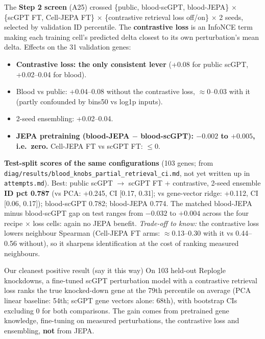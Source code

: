\documentclass[11pt]{article}
\newcommand{\code}[1]{\texttt{\small #1}}
\begin{document}
The \textbf{Step 2 screen} (A25) crossed \{public, blood-scGPT, blood-JEPA\} $\times$ \{scGPT FT, Cell-JEPA FT\} $\times$ \{contrastive retrieval loss off/on\} $\times$ 2 seeds, selected by validation ID percentile. The \textbf{contrastive loss} is an InfoNCE term making each training cell's predicted delta closest to its own perturbation's mean delta. Effects on the 31 validation genes:
\begin{itemize}
\item \textbf{Contrastive loss: the only consistent lever} (+0.08 for public scGPT, +0.02--0.04 for blood).
\item Blood vs public: +0.04--0.08 without the contrastive loss, $\approx$0--0.03 with it (partly confounded by bins50 vs log1p inputs).
\item 2-seed ensembling: +0.02--0.04.
\item \textbf{JEPA pretraining (blood-JEPA $-$ blood-scGPT): $-0.002$ to $+0.005$, i.e.\ zero.} Cell-JEPA FT vs scGPT FT: $\le 0$.
\end{itemize}

\textbf{Test-split scores of the same configurations} (103 genes; from \code{diag/results/blood\_knobs\_partial\_retrieval\_ci.md}, not yet written up in \code{attempts.md}). Best: public scGPT $\to$ scGPT FT + contrastive, 2-seed ensemble \textbf{ID pct 0.787} (vs PCA: +0.245, CI [0.17, 0.31]; vs gene-vector ridge: +0.112, CI [0.06, 0.17]); blood-scGPT 0.782; blood-JEPA 0.774. The matched blood-JEPA minus blood-scGPT gap on test ranges from $-0.032$ to $+0.004$ across the four recipe $\times$ loss cells: again no JEPA benefit. \emph{Trade-off to know:} the contrastive loss lowers neighbour Spearman (Cell-JEPA FT arms: $\approx$0.13--0.30 with it vs 0.44--0.56 without), so it sharpens identification at the cost of ranking measured neighbours.

\begin{keybox}{Our cleanest positive result (say it this way)}
On 103 held-out Replogle knockdowns, a fine-tuned scGPT perturbation model with a contrastive retrieval loss ranks the true knocked-down gene at the 79th percentile on average (PCA linear baseline: 54th; scGPT gene vectors alone: 68th), with bootstrap CIs excluding 0 for both comparisons. The gain comes from pretrained gene knowledge, fine-tuning on measured perturbations, the contrastive loss and ensembling, \textbf{not} from JEPA.
\end{keybox}
\end{document}
